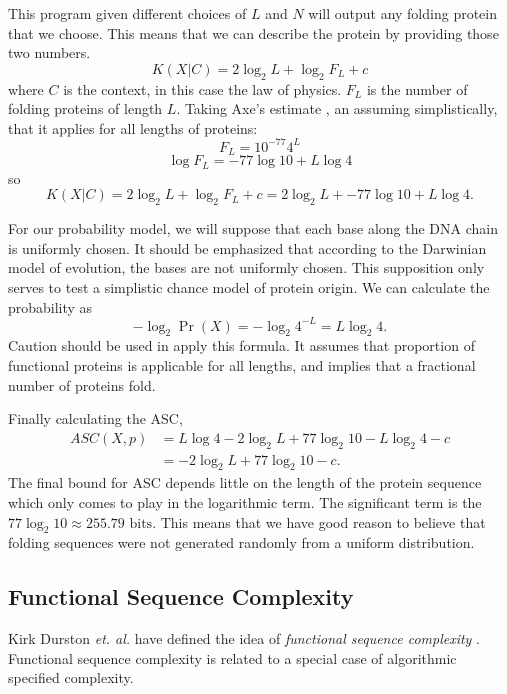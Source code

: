 This program given different choices of $L$ and $N$ will output any folding protein that we choose.
This means that we can describe the protein by providing those two numbers.
\begin{equation}
    K(X|C) = 2 \log_2 L + \log_2 F_L + c
\end{equation} where $C$ is the context, in this case the law of physics.
$F_L$ is the number of folding proteins of length $L$.
Taking Axe's estimate \cite{axe2004}, an assuming simplistically, that it applies for all lengths of proteins:
\begin{equation}
    F_L = 10^{-77} 4^L 
\end{equation}
\begin{equation}
    \log F_L = -77 \log 10 + L \log 4
\end{equation}
so
\begin{equation}
    K(X|C) = 2 \log_2 L + \log_2 F_L + c = 2 \log_2 L + -77 \log 10  + L \log 4 \mbox{.}
\end{equation}

For our probability model, we will suppose that each base along the DNA chain is uniformly chosen.
It should be emphasized that according to the Darwinian model of evolution, the bases are not uniformly chosen.
This supposition only serves to test a simplistic chance model of protein origin.
We can calculate the probability as
\begin{equation}
    -\log_2 \Pr(X) =  -\log_2 4^{-L} = L \log_2 4 \mbox{.}
\end{equation}
Caution should be used in apply this formula.
It assumes that proportion of functional proteins is applicable for all lengths, and implies that a fractional number of proteins fold.

Finally calculating the ASC,
\begin{align}
    ASC(X,p) &= L \log 4 - 2 \log_2 L + 77 \log_2 10 - L \log_2 4 - c \nonumber \\
    &= - 2 \log_2 L + 77 \log_2 10 - c \mbox{.}
\end{align}
The final bound for ASC depends little on the length of the protein sequence which only comes to play in the logarithmic term.
The significant term is the $77 \log_2 10 \approx 255.79 \mbox{ bits}$.
This means that we have good reason to believe that folding sequences were not generated randomly from a uniform distribution.

\subsection{Functional Sequence Complexity}
Kirk Durston {\it et. al.} have defined the idea of {\it functional sequence complexity} \citep{Durston2007}.
Functional sequence complexity is related to a special case of algorithmic specified complexity.

